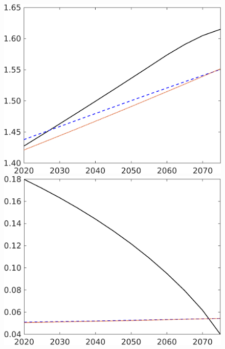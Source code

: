\begin{figure}[h!!]
\begin{minipage}[]{0.32\textwidth}
	\end{minipage}
	\begin{minipage}[]{0.32\textwidth}
		\includegraphics[width=1\textwidth]{../../codding_model/own_basedOnFried/optimalPol_elastS_DisuSci/figures/all_1705/C_CompEffOPT_NOT_NoTaus_spillover0_noskill1_sep1_BN0_ineq0_red0_etaa0.79_lgd0.png}
	\end{minipage}
	\begin{minipage}[]{0.32\textwidth}
		\includegraphics[width=1\textwidth]{../../codding_model/own_basedOnFried/optimalPol_elastS_DisuSci/figures/all_1705/sg_CompEffOPT_NOT_NoTaus_spillover0_noskill1_sep1_BN0_ineq0_red0_etaa0.79_lgd0.png}

\end{minipage}
\end{figure}
